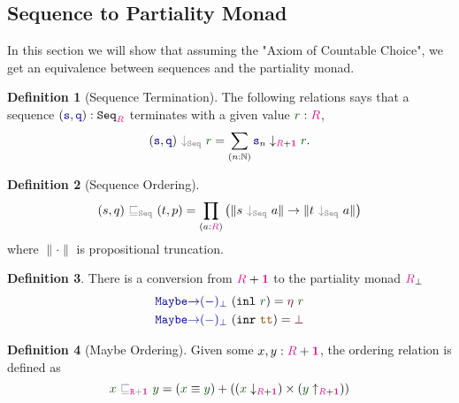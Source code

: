 \documentclass[twoside,11pt,openright]{report}
\theoremstyle{plain} %
\theoremstyle{definition}
\newtheorem{defn}{Definition}[section]
\theoremstyle{remark}
\newcommand*{\term}[1]{\textcolor{green!30!black}{#1}} %
\newcommand*{\type}[1]{\textcolor{magenta!90!black}{#1}}
\newcommand*{\unit}{\type{\textbf{1}}}
\newcommand*{\relation}[1]{\textcolor{gray}{\ensuremath{\mathtt{#1}}}}
\newcommand*{\constant}[1]{\textcolor{orange!60!black}{\ensuremath{\mathtt{#1}}}}
\newcommand*{\function}[1]{\textcolor{blue!60!black}{\ensuremath{\mathtt{#1}}}}
\newcommand*{\constructor}[1]{\textcolor{purple!60!black}{\ensuremath{\mathtt{#1}}}}
\newcommand*{\typeformer}[1]{\ensuremath{\mathtt{#1}}}
\begin{document}
\subsection{Sequence to Partiality Monad}
In this section we will show that assuming the "Axiom of Countable Choice", we get an equivalence between sequences and the partiality monad.
\begin{defn}[Sequence Termination]
  The following relations says that a sequence \((\function{s},\function{q}) : \typeformer{Seq}_{\type{R}}\) terminates with a given value \(\term{r} : \type{R}\),
  \begin{equation}
    (\function{s},\function{q})~\relation{\downarrow_{\mathtt{Seq}}}~\term{r} = \sum_{(n : \mathbb{N})} \function{s}_n \downarrow_{\type{R} + \unit} \term{r}.
  \end{equation}
\end{defn}
\begin{defn}[Sequence Ordering]
\begin{equation}
  (s,q)~\relation{\sqsubseteq_{\mathtt{Seq}}}~(t,p) = \prod_{(a : \type{R})} \left(\|s~\relation{\downarrow_{\mathtt{Seq}}}~a\| \rightarrow \| t~\relation{\downarrow_{\mathtt{Seq}}}~a\|\right)
\end{equation}
where \(\| \cdot \|\) is propositional  truncation.
\end{defn}
\begin{defn} There is a conversion from \(\type{R} + \unit\) to the partiality monad \(\type{R}_\bot\)
  \begin{equation}
    \begin{aligned}
      &\function{Maybe{\rightarrow}(-)_\bot}~(\mathtt{inl}~\term{r}) = \constructor{\eta}~\term{r} \\
      &\function{Maybe{\rightarrow}(-)_\bot}~(\mathtt{inr}~\constant{tt}) = \constructor{\bot}
    \end{aligned}
  \end{equation}
\end{defn}
\begin{defn}[Maybe Ordering]
  \label{eq:maybe-order}
  Given some \(x,y : \type{R} + \unit\), the ordering relation is defined as
  \begin{equation}
    \term{x}~\relation{\sqsubseteq_{\type{R} + \unit}}~\term{y} = (\term{x} \equiv \term{y}) + ((\term{x}  \downarrow_{\type{R} + \unit}) \times (\term{y} \uparrow_{\type{R} + \unit}))
  \end{equation}
\end{defn}
\end{document}
